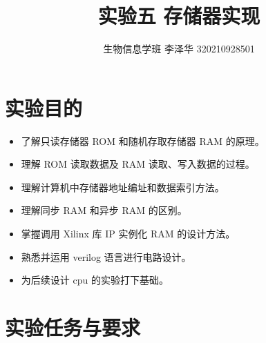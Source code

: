 \documentclass[AutoFakeBold]{LZUThesis}
\begin{document}
\title{{实验五 存储器实现}}


\author{生物信息学班 李泽华 320210928501}


\frontmatter




\mainmatter

\chapter{实验目的}
\begin{itemize}
    \item 了解只读存储器 ROM 和随机存取存储器 RAM 的原理。
    \item 理解 ROM 读取数据及 RAM 读取、写入数据的过程。
    \item 理解计算机中存储器地址编址和数据索引方法。
    \item 理解同步 RAM 和异步 RAM 的区别。
    \item 掌握调用 Xilinx 库 IP 实例化 RAM 的设计方法。
    \item 熟悉并运用 verilog 语言进行电路设计。
    \item 为后续设计 cpu 的实验打下基础。
\end{itemize}
\chapter{实验任务与要求}
\end{document}
